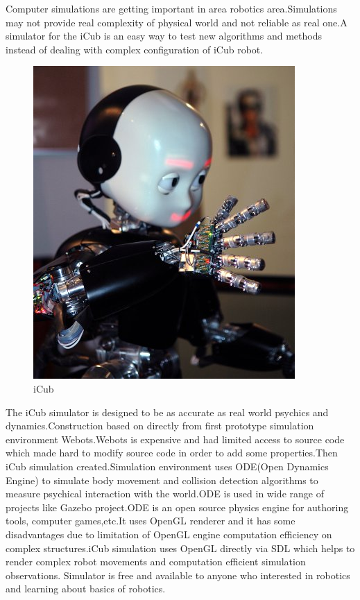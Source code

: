 \documentclass[12pt]{report}
\begin{document}
Computer simulations are getting important in area robotics area.Simulations may not provide real complexity of physical world and not reliable as real one.A simulator for the iCub is an easy way to test new algorithms and methods instead of dealing with complex configuration of iCub robot.
\begin{figure}[!h]
\begin{center}
\includegraphics[scale=1.7]{iCub.jpg}
\caption{iCub}
\end{center}
\end{figure}
The iCub simulator is designed to be as accurate as real world psychics and dynamics.Construction based on directly from first prototype simulation environment Webots\cite{webots}.Webots is expensive and had limited access to source code which made hard to modify source code in order to add some properties.Then iCub simulation created.Simulation environment uses ODE(Open Dynamics Engine)\cite{ode} to simulate body movement and collision detection algorithms to measure psychical interaction with the world.ODE is used in wide range of projects like Gazebo project.\cite{gazebo}ODE is an open source physics engine for authoring tools, computer games,etc.It uses OpenGL renderer and it has some disadvantages due to limitation of OpenGL engine computation efficiency on complex structures.iCub simulation uses OpenGL directly via SDL which helps to render complex robot movements and computation efficient simulation observations.\cite{sdl} Simulator is free and available to anyone who interested in robotics and learning about basics of robotics.
\newpage
\end{document}
